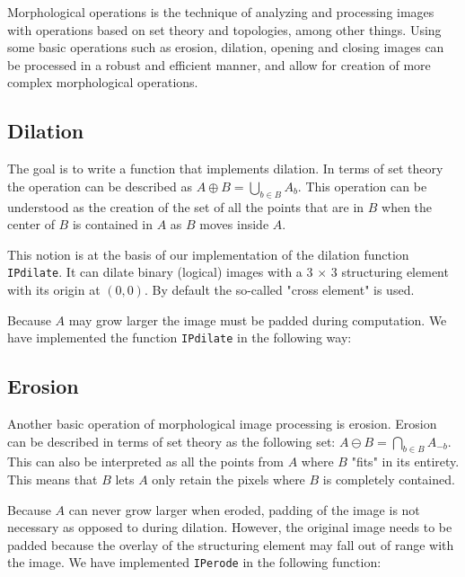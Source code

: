 Morphological operations is the technique of analyzing and processing images with operations based on set theory and topologies, among other things. Using some basic operations such as erosion, dilation, opening and closing images can be processed in a robust and efficient manner, and allow for creation of more complex morphological operations. 
\subsection{Dilation}
The goal is to write a function that implements dilation. In terms of set theory the operation can be described as $A \oplus B = \underset{b \in B}\bigcup A_b$. This operation can be understood as the creation of the set of all the points that are in $B$ when the center of $B$ is contained in $A$ as $B$ moves inside $A$.

This notion is at the basis of our implementation of the dilation function \texttt{IPdilate}. It can dilate binary (logical) images with a 3 $\times$ 3 structuring element with its origin at $(0, 0)$. By default the so-called "cross element" is used.

Because $A$ may grow larger the image must be padded during computation. We have implemented the function \texttt{IPdilate} in the following way:
\subsection{Erosion}
Another basic operation of morphological image processing is erosion. Erosion can be described in terms of set theory as the following set: $A \ominus B = \underset{b \in B}\bigcap A_{-b}$. This can also be interpreted as all the points from $A$ where $B$ "fits" in its entirety. This means that $B$ lets $A$ only retain the pixels where $B$ is completely contained. 

Because $A$ can never grow larger when eroded, padding of the image is not necessary as opposed to during dilation. However, the original image needs to be padded because the overlay of the structuring element may fall out of range with the image. We have implemented \texttt{IPerode} in the following function:
\clearpage
